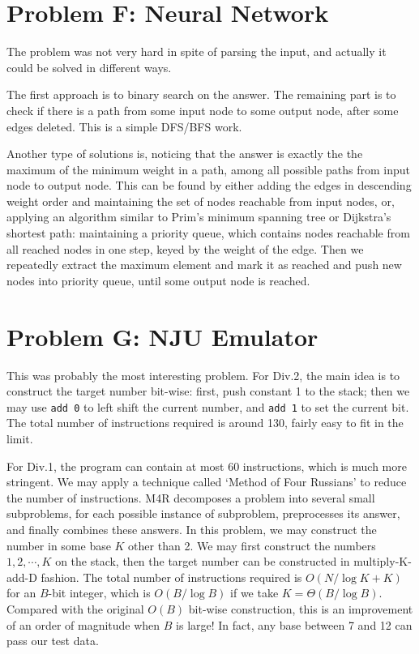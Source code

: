 \documentclass[a4paper,10.5pt,twoside]{article}
\begin{document}
\section*{Problem F: Neural Network}

The problem was not very hard in spite of parsing the input, and actually it could be solved in different ways.

The first approach is to binary search on the answer. The remaining part is to check if there is a path from some input node to some output node, after some edges deleted. This is a simple DFS/BFS work.

Another type of solutions is, noticing that the answer is exactly the the maximum of the minimum weight in a path, among all possible paths from input node to output node. This can be found by either adding the edges in descending weight order and maintaining the set of nodes reachable from input nodes, or, applying an algorithm similar to Prim's minimum spanning tree or Dijkstra's shortest path: maintaining a priority queue, which contains nodes reachable from all reached nodes in one step, keyed by the weight of the edge. Then we repeatedly extract the maximum element and mark it as reached and push new nodes into priority queue, until some output node is reached.

\section*{Problem G: NJU Emulator}

This was probably the most interesting problem. For Div.2, the main idea is to construct the target number bit-wise: first, push constant 1 to the stack; then we may use \texttt{add 0} to left shift the current number, and \texttt{add 1} to set the current bit. The total number of instructions required is around 130, fairly easy to fit in the limit.

For Div.1, the program can contain at most 60 instructions, which is much more stringent. We may apply a technique called `Method of Four Russians' to reduce the number of instructions. M4R decomposes a problem into several small subproblems,  for each possible instance of subproblem, preprocesses its answer, and finally combines these answers. In this problem, we may construct the number in some base $K$ other than 2. We may first construct the numbers $1, 2, \cdots, K$ on the stack, then the target number can be constructed in multiply-K-add-D fashion. The total number of instructions required is $O(N / \log K + K)$ for an $B$-bit integer, which is $O(B / \log B)$ if we take $K = \Theta(B / \log B)$. Compared with the original $O(B)$ bit-wise construction, this is an improvement of an order of magnitude when $B$ is large! In fact, any base between 7 and 12 can pass our test data.
\end{document}
